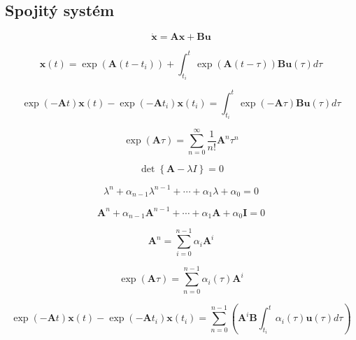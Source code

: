 \documentclass[a4paper, 10pt, ]{article}
\begin{document}
\subsection{Spojitý systém}

\begin{equation}
    \label{Controllability.Continuous.Equation:StateSpaceModel}
    \dot{\bm{x}} = \bm{A} \bm{x} + \bm{B} \bm{u}
\end{equation}

\begin{equation}
    \bm{x}(t) = \exp \left( \bm{A} (t - t_i) \right) + \int_{t_i}^{t} \exp(\bm{A} (t - \tau)) \bm{B} \bm{u}(\tau) d\tau
\end{equation}

\begin{equation}
    \exp(-\bm{A}t) \bm{x}(t) - \exp(-\bm{A} t_i) \bm{x}(t_i) = \int_{t_i}^{t} \exp(-\bm{A} \tau) \bm{B} \bm{u}(\tau) d\tau
\end{equation}

\begin{equation}
    \exp(\bm{A}\tau) = \sum_{n = 0}^{\infty} \frac{1}{n!} \bm{A}^{n} \tau^{n}
\end{equation}

\begin{equation}
    \det \left\{ \bm{A} - \lambda {I} \right\} = 0
\end{equation}

\begin{equation}
    \lambda^n + \alpha_{n - 1} \lambda^{n - 1} + \cdots + \alpha_{1} \lambda + \alpha_{0} = 0
\end{equation}

\begin{equation}
    \bm{A}^n + \alpha_{n - 1} \bm{A}^{n - 1} + \cdots + \alpha_{1} \bm{A} + \alpha_{0} \bm{I} = 0
\end{equation}

\begin{equation}
    \bm{A}^n = \sum_{i = 0}^{n - 1} \alpha_{i} \bm{A}^{i}
\end{equation}

\begin{equation}
    \exp(\bm{A} \tau) = \sum_{n = 0}^{n - 1} \alpha_i(\tau) \bm{A}^{i}
\end{equation}

\begin{equation}
    \exp(-\bm{A} t) \bm{x}(t) - \exp(-\bm{A} t_i) \bm{x}(t_i) = \sum_{n = 0}^{n - 1} \left( \bm{A}^{i} \bm{B} \int_{t_i}^{t} \alpha_i(\tau) \bm{u}(\tau) d\tau \right)
\end{equation}
\end{document}
